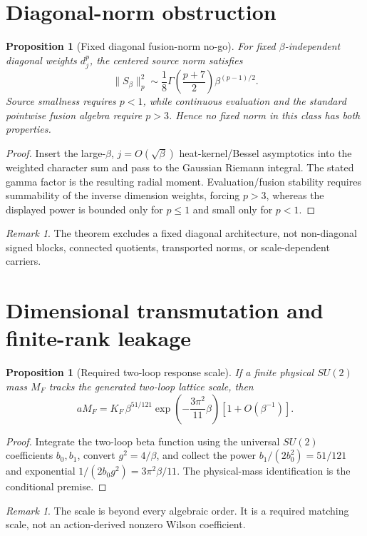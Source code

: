 \documentclass[11pt,oneside]{report}
\newtheorem{proposition}[theorem]{Proposition}
\theoremstyle{definition}
\theoremstyle{remark}
\newtheorem{remark}[theorem]{Remark}
\begin{document}
\section{Diagonal-norm obstruction}
\begin{proposition}[Fixed diagonal fusion-norm no-go]
For fixed $\beta$-independent diagonal weights $d_j^p$, the centered source
norm satisfies
\[
 \|S_\beta\|_p^2\sim\frac18\Gamma\!\left(\frac{p+7}{2}\right)
 \beta^{(p-1)/2}.
\]
Source smallness requires $p<1$, while continuous evaluation and the standard
pointwise fusion algebra require $p>3$. Hence no fixed norm in this class has
both properties.
\end{proposition}
\begin{proof}
Insert the large-$\beta$, $j=O(\sqrt\beta)$ heat-kernel/Bessel asymptotics into
the weighted character sum and pass to the Gaussian Riemann integral. The
stated gamma factor is the resulting radial moment. Evaluation/fusion
stability requires summability of the inverse dimension weights, forcing
$p>3$, whereas the displayed power is bounded only for $p\leq1$ and small only
for $p<1$.
\end{proof}
\begin{remark}
The theorem excludes a fixed diagonal architecture, not non-diagonal signed
blocks, connected quotients, transported norms, or scale-dependent carriers.
\end{remark}

\section{Dimensional transmutation and finite-rank leakage}
\begin{proposition}[Required two-loop response scale]
If a finite physical $SU(2)$ mass $M_F$ tracks the generated two-loop lattice
scale, then
\[
 aM_F=K_F\,\beta^{51/121}
 \exp\!\left(-\frac{3\pi^2}{11}\beta\right)
 [1+O(\beta^{-1})].
\]
\end{proposition}
\begin{proof}
Integrate the two-loop beta function using the universal $SU(2)$ coefficients
$b_0,b_1$, convert $g^2=4/\beta$, and collect the power
$b_1/(2b_0^2)=51/121$ and exponential $1/(2b_0g^2)=3\pi^2\beta/11$.
The physical-mass identification is the conditional premise.
\end{proof}
\begin{remark}
The scale is beyond every algebraic order. It is a required matching scale,
not an action-derived nonzero Wilson coefficient.
\end{remark}
\end{document}
